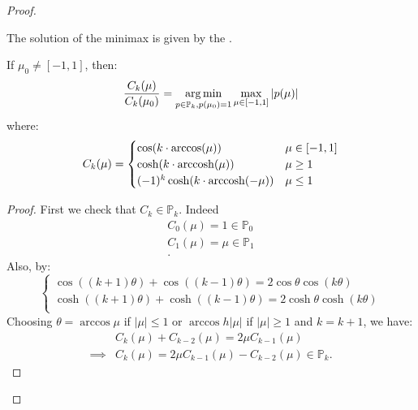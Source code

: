 \documentclass[../main/main.tex]{subfiles}
\begin{document}
\begin{proof}
\begin{enumerate}
        The solution of the minimax is given by the .
\end{enumerate}
\begin{lemma}
  If $\mu _{0}\neq [-1,1]$, then: \[
    \frac{C_{k}(\mu)}{C_{k}(\mu_{0})} = \operatorname*{arg\,min}_{p\in \mathbb{P}_{k}, p(\mu_{0})=1}\max_{\mu  \in [-1,1]} |p(\mu)|
  \] where: \[
C_{k}(\mu) = \begin{cases}
 \cos (k\cdot \arccos(\mu)) & \mu  \in [-1,1]\\
 \cosh (k\cdot \operatorname*{arccosh}(\mu)) & \mu \geq 1\\
(-1)^{k} \cosh (k\cdot \operatorname*{arccosh}(-\mu)) & \mu \leq  1
\end{cases}
  \]
\end{lemma}
\begin{proof}
  First we check that $C_{k} \in  \mathbb{P}_{k}$. Indeed \begin{align*}
                                                            C_{0}(\mu)=1\in \mathbb{P}_{0}\\
                                                            C_{1}(\mu) = \mu \in \mathbb{P}_{1}\\
                                                            .\end{align*} Also, by: \[
\begin{cases}
  \cos ((k+1)\theta ) + \cos ((k-1)\theta) = 2\cos \theta  \cos (k\theta)\\
  \cosh ((k+1)\theta ) + \cosh ((k-1)\theta) = 2\cosh \theta  \cosh (k\theta)\\
\end{cases} \] Choosing $\theta  = \arccos  \mu $ if $|\mu |\leq 1$ or $\arccos h |\mu |$ if $|\mu |\geq 1$ and $k = k+1$, we have:
\begin{align*}
  &C_{k}(\mu)+C_{k-2}(\mu) = 2 \mu C_{k-1}(\mu)\\
  \implies & C_{k}(\mu) = 2\mu C_{k-1}(\mu)-C_{k-2}(\mu) \in \mathbb{P}_{k}
  .\end{align*}
\end{proof}


\end{proof}
\end{document}

